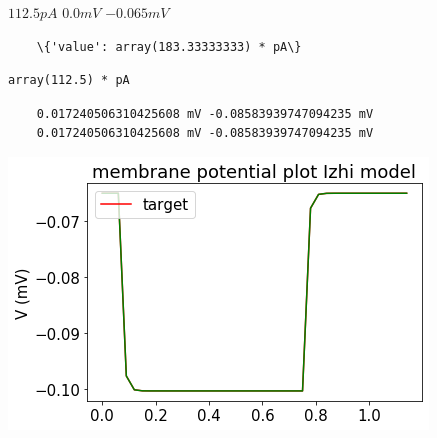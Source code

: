     


$ 112.5 pA $
$0.0 mV$ $-0.065 mV$

    \begin{verbatim}
    \{'value': array(183.33333333) * pA\}
    \end{verbatim}

\begin{verbatim}
array(112.5) * pA
\end{verbatim}


\begin{verbatim}
    0.017240506310425608 mV -0.08583939747094235 mV
    0.017240506310425608 mV -0.08583939747094235 mV
\end{verbatim}

    \begin{center}
    \includegraphics{figures/backend_check_files/backend_check_32_2.png}
    \end{center}
